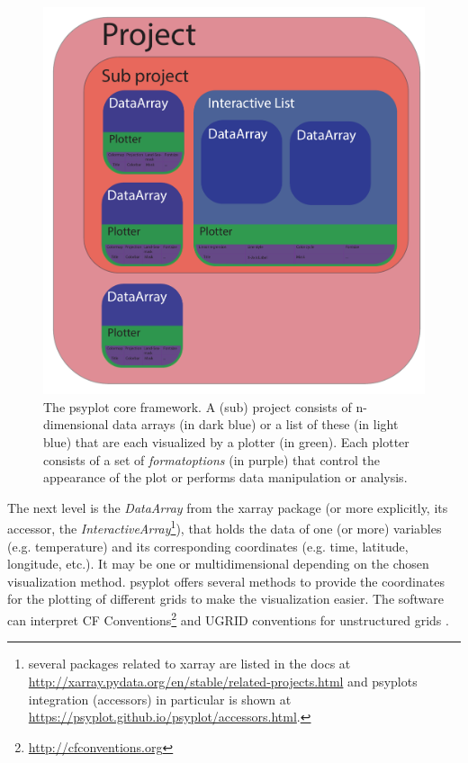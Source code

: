 \documentclass[
11pt, %
english, %
singlespacing, %
headsepline, %
]{article} %
\begin{document}
\begin{refsection}
\begin{figure}
	\includegraphics[width=\linewidth]{psyplot-figures/psyplot_framework.pdf}
	\caption[The psyplot core framework]{The psyplot core framework. A (sub) project consists of n-dimensional data arrays (in dark blue) or a list of these (in light blue) that are each visualized by a plotter (in green). Each plotter consists of a set of \textit{formatoptions} (in purple) that control the appearance of the plot or performs data manipulation or analysis.}
	\label{fig:psyplot-core}
\end{figure}

The next level is the \textit{DataArray} from the xarray package (or more explicitly, its accessor, the \textit{InteractiveArray}\footnote{\label{foot:xraccessors} several packages related to xarray are listed in the docs at \url{http://xarray.pydata.org/en/stable/related-projects.html} and psyplots integration (accessors) in particular is shown at \url{https://psyplot.github.io/psyplot/accessors.html}.}), that holds the data of one (or more) variables (e.g. temperature) and its corresponding coordinates (e.g. time, latitude, longitude, etc.). It may be one or multidimensional depending on the chosen visualization method. psyplot offers several methods to provide the coordinates for the plotting of different grids to make the visualization easier. The software can interpret CF Conventions\footnote{\url{http://cfconventions.org}} and UGRID conventions for unstructured grids \citep{JagersStuebeGrossEtAl2018}.


\end{refsection}
\end{document}
